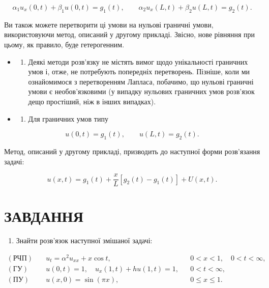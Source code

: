 \[
\alpha_1 u_x(0,t) + \beta_1 u(0,t) = g_1(t), \qquad \alpha_2 u_x(L,t) + \beta_2 u(L,t) = g_2(t).
\]

Ви також можете перетворити ці умови на нульові граничні умови, використовуючи метод, описаний у другому прикладі. Звісно, нове рівняння при цьому, як правило, буде гетерогенним.

\begin{itemize}
\tightlist
\item
  \begin{enumerate}
  \def\labelenumi{\arabic{enumi}.}
  \setcounter{enumi}{2}
  \tightlist
  \item
    Деякі методи розв'язку не містять вимог щодо унікальності граничних умов і, отже, не потребують попередніх перетворень. Пізніше, коли ми ознайомимося з перетворенням Лапласа, побачимо, що нульові граничні умови є необов'язковими (у випадку нульових граничних умов розв'язок дещо простіший, ніж в інших випадках).
  \end{enumerate}
\item
  \begin{enumerate}
  \def\labelenumi{\arabic{enumi}.}
  \setcounter{enumi}{3}
  \tightlist
  \item
    Для граничних умов типу
  \end{enumerate}
\end{itemize}

\[
u(0, t)=g_1(t), \qquad u(L, t)=g_2(t).
\]

Метод, описаний у другому прикладі, призводить до наступної форми розв'язання задачі:

\[
u(x, t)=g_1(t)+\frac{x}{L}\left[g_2(t)-g_1(t)\right]+U(x, t).
\]

\section{ЗАВДАННЯ}\label{ux437ux430ux432ux434ux430ux43dux43dux44f-5}

\begin{enumerate}
\def\labelenumi{\arabic{enumi}.}
\tightlist
\item
  Знайти розв'язок наступної змішаної задачі:
\end{enumerate}

\[
\begin{aligned}
(\text{РЧП})\quad & u_t = \alpha^2 u_{xx} + x\cos t, && 0 < x < 1,\quad 0 < t < \infty, \\
(\text{ГУ})\quad & u(0,t) = 1,\quad u_x(1,t) + hu(1,t) = 1, && 0 < t < \infty, \\
(\text{ПУ})\quad & u(x,0) = \sin(\pi x), && 0 \leqslant x \leqslant 1.
\end{aligned}
\]

